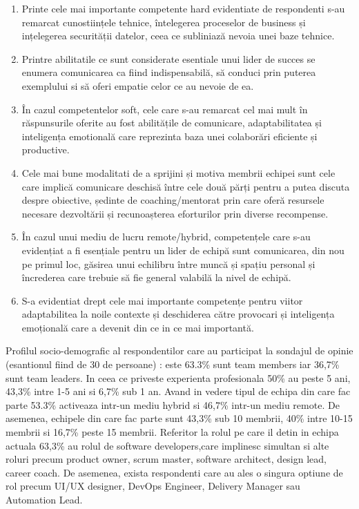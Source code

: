 \documentclass[a4paper, 12pt]{article}
\begin{document}
	\begin{enumerate}[(1)]

	\item Printe cele mai importante competente hard evidentiate de respondenti s-au remarcat cunostiințele tehnice, întelegerea proceselor de business și ințelegerea securității datelor, ceea ce subliniază nevoia unei baze tehnice.

	\item Printre abilitatile ce sunt considerate esentiale unui lider de succes se enumera comunicarea ca fiind indispensabilă, să conduci prin puterea exemplului si să oferi empatie celor ce au nevoie de ea.

	\item În cazul competentelor soft, cele care s-au remarcat cel mai mult în răspunsurile oferite au fost abilitățile de comunicare, adaptabilitatea și inteligența emotională care reprezinta baza unei colaborări eficiente și productive.

	\item Cele mai bune modalitati de a sprijini și motiva membrii echipei sunt cele care implică comunicare deschisă între cele două părți pentru a putea discuta despre obiective, ședinte de coaching/mentorat prin care oferă resursele necesare dezvoltării și recunoașterea eforturilor prin diverse recompense.

	\item În cazul unui mediu de lucru remote/hybrid, competențele care s-au evidențiat a fi esențiale pentru un lider de echipă sunt comunicarea, din nou pe primul loc, găsirea unui echilibru între muncă și spațiu personal și încrederea care trebuie să fie general valabilă la nivel de echipă.

	\item S-a evidentiat drept cele mai importante competențe pentru viitor adaptabilitea la noile contexte și deschiderea către provocari și inteligența emoțională care a devenit din ce in ce mai importantă.

	\end{enumerate}
 	
\quad Profilul socio-demografic al respondentilor care au participat la sondajul de opinie (esantionul fiind de 30 de persoane) : este 63.3\% sunt team members iar 36,7\% sunt team leaders.  In ceea ce priveste experienta profesionala 50\% au peste 5 ani, 43,3\% intre 1-5 ani si 6,7\% sub 1 an. Avand in vedere tipul de echipa din care fac parte 53.3\% activeaza intr-un mediu hybrid si 46,7\% intr-un mediu remote. De asemenea, echipele din care fac parte sunt 43,3\% sub 10 membrii, 40\% intre 10-15 membrii si 16,7\% peste 15 membrii.  Referitor la rolul pe care il detin in echipa actuala 63,3\% au rolul de software developers,care implinesc simultan si alte roluri precum product owner, scrum master, software architect, design lead, career coach. De asemenea, exista respondenti care au ales o singura optiune de rol precum UI/UX designer, DevOps Engineer, Delivery Manager sau Automation Lead.
\newpage
\end{document}

